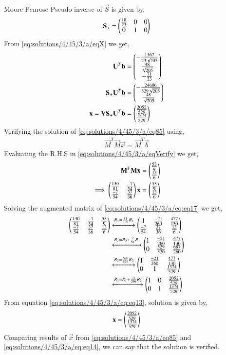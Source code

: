 Moore-Penrose Pseudo inverse of $\vec{S}$ is given by,
\begin{align}
\mathbf{S_+} = \begin{pmatrix}\frac{18}{23}&0&0\\0&1&0\end{pmatrix}
\end{align}
From \eqref{eq:solutions/4/45/3/a/eqX} we get,
\begin{align}
\mathbf{U}^T\mathbf{b}&=\begin{pmatrix}-\frac{1367}{23\sqrt{205}}\\\frac{48}{\sqrt{205}}\\-\frac{71}{23}\end{pmatrix}\\
\mathbf{S_+}\mathbf{U}^T\mathbf{b}&=\begin{pmatrix}-\frac{24606}{529\sqrt{205}}\\\frac{48}{\sqrt{205}}\end{pmatrix}\\
\mathbf{x} = \mathbf{V}\mathbf{S_+}\mathbf{U}^T\mathbf{b} &= \begin{pmatrix}\frac{2052}{529}\\\frac{1374}{529}\end{pmatrix}\label{eq:solutions/4/45/3/a/eq85}
\end{align}
Verifying the solution of \eqref{eq:solutions/4/45/3/a/eq85} using,
\begin{align}
\vec{M}^T\vec{M}\vec{x} = \vec{M}^T\vec{b}\label{eq:solutions/4/45/3/a/eqVerify}
\end{align}
Evaluating the R.H.S in \eqref{eq:solutions/4/45/3/a/eqVerify} we get,
\begin{align}
\mathbf{M}^T\mathbf{M}\mathbf{x} &= \begin{pmatrix}\frac{53}{9}\\\frac{13}{6}\end{pmatrix}\\
\implies\begin{pmatrix}\frac{130}{81}&\frac{-7}{54}\\\frac{-7}{54}&\frac{37}{36}\end{pmatrix}\mathbf{x} &= \begin{pmatrix}\frac{53}{9}\\\frac{13}{6}\end{pmatrix}\label{eq:solutions/4/45/3/a/eq:eq17}
\end{align}
Solving the augmented matrix of \eqref{eq:solutions/4/45/3/a/eq:eq17} we get,
\begin{align}
\begin{pmatrix}\frac{130}{81}&\frac{-7}{54}&\frac{53}{9}\\\frac{-7}{54}&\frac{37}{36}&\frac{13}{6}\end{pmatrix} &\xleftrightarrow{R_1=\frac{81}{130}R_1}\begin{pmatrix}1&\frac{-21}{260}&\frac{477}{130}\\\frac{-7}{54}&\frac{37}{36}&\frac{13}{6}\end{pmatrix}\\
&\xleftrightarrow{R_2=R_2+\frac{7}{54}R_1}\begin{pmatrix}1&\frac{-21}{260}&\frac{477}{130}\\0&\frac{529}{520}&\frac{687}{260}\end{pmatrix}\\
&\xleftrightarrow{R_2=\frac{520}{529}R_2}\begin{pmatrix}1&\frac{-21}{260}&\frac{477}{130}\\0&1&\frac{1374}{529}\end{pmatrix}\\
&\xleftrightarrow{R_1=R_1+\frac{21}{260}R_2}\begin{pmatrix}1&0&\frac{2052}{529}\\0&1&\frac{1374}{529}\end{pmatrix}\label{eq:solutions/4/45/3/a/eq:eq13}
\end{align}
From equation \eqref{eq:solutions/4/45/3/a/eq:eq13}, solution is given by,
\begin{align}\label{eq:solutions/4/45/3/a/eq:eq14}
\mathbf{x}=\begin{pmatrix}\frac{2052}{529}\\\frac{1374}{529}\end{pmatrix}
\end{align}
Comparing results of $\vec{x}$ from \eqref{eq:solutions/4/45/3/a/eq85} and \eqref{eq:solutions/4/45/3/a/eq:eq14}, we can say that the solution is verified.
 
